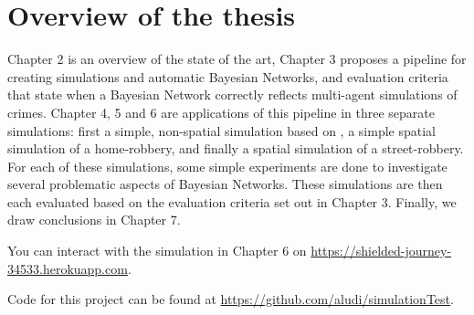 \section{Overview of the thesis}
Chapter 2 is an overview of the state of the art, Chapter 3 proposes a pipeline for creating simulations and automatic Bayesian Networks, and evaluation criteria that state when a Bayesian Network correctly reflects multi-agent simulations of crimes. Chapter 4, 5 and 6 are applications of this pipeline in three separate simulations: first a simple, non-spatial simulation based on \citep{Vlek2015}, a simple spatial simulation of a home-robbery, and finally a spatial simulation of a street-robbery. For each of these simulations, some simple experiments are done to investigate several problematic aspects of Bayesian Networks. These simulations are then each evaluated based on the evaluation criteria set out in Chapter 3. Finally, we draw conclusions in Chapter 7. 

You can interact with the simulation in Chapter 6 on \url{https://shielded-journey-34533.herokuapp.com}.

Code for this project can be found at \url{https://github.com/aludi/simulationTest}.
